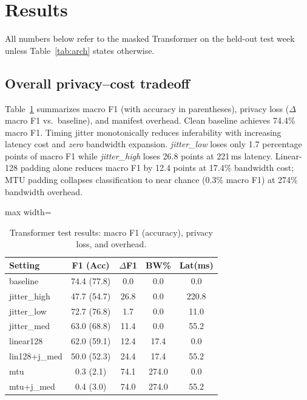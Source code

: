 \section{Results}
\label{sec:results}

All numbers below refer to the masked Transformer on the held-out test week unless
Table~\ref{tab:arch} states otherwise.

\subsection{Overall privacy--cost tradeoff}

Table~\ref{tab:main_results} summarizes macro F1 (with accuracy in parentheses),
privacy loss ($\Delta$ macro F1 vs.\ baseline), and manifest overhead. Clean baseline
achieves 74.4\% macro F1. Timing jitter monotonically reduces inferability with
increasing latency cost and \emph{zero} bandwidth expansion. \emph{jitter\_low} loses
only 1.7 percentage points of macro F1 while \emph{jitter\_high} loses 26.8 points at
221\,ms latency. Linear-128 padding alone reduces macro F1 by 12.4 points at 17.4\%
bandwidth cost; MTU padding collapses classification to near chance (0.3\% macro F1)
at 274\% bandwidth overhead.

\begin{table}[t]
  \centering
  \caption{Transformer test results: macro F1 (accuracy), privacy loss, and overhead.}
  \label{tab:main_results}
  \footnotesize
  \setlength{\tabcolsep}{3pt}
  \begin{adjustbox}{max width=\columnwidth}
  \begin{tabular}{@{}lcccc@{}}
    \toprule
    Setting & F1 (Acc) & $\Delta$F1 & BW\% & Lat(ms) \\
    \midrule
    baseline & 74.4 (77.8) & 0.0 & 0.0 & 0.0 \\
    jitter\_high & 47.7 (54.7) & 26.8 & 0.0 & 220.8 \\
    jitter\_low & 72.7 (76.8) & 1.7 & 0.0 & 11.0 \\
    jitter\_med & 63.0 (68.8) & 11.4 & 0.0 & 55.2 \\
    linear128 & 62.0 (59.1) & 12.4 & 17.4 & 0.0 \\
    lin128+j\_med & 50.0 (52.3) & 24.4 & 17.4 & 55.2 \\
    mtu & 0.3 (2.1) & 74.1 & 274.0 & 0.0 \\
    mtu+j\_med & 0.4 (3.0) & 74.0 & 274.0 & 55.2 \\
    \bottomrule
  \end{tabular}
  \end{adjustbox}
\end{table}

